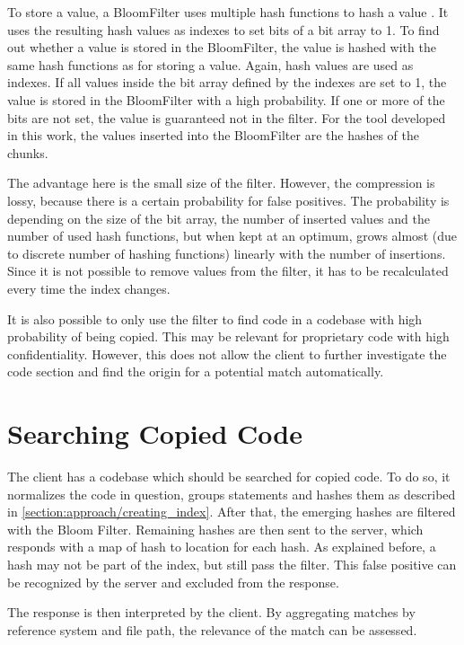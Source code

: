 To store a value, a BloomFilter uses multiple hash functions to hash a value \cite{bloom1970filter}.
It uses the resulting hash values as indexes to set bits of a bit array to 1.
To find out whether a value is stored in the BloomFilter, the value is hashed with the same hash functions as for storing a value.
Again, hash values are used as indexes.
If all values inside the bit array defined by the indexes are set to 1, the value is stored in the BloomFilter with a high probability.
If one or more of the bits are not set, the value is guaranteed not in the filter.
For the tool developed in this work, the values inserted into the BloomFilter are the hashes of the chunks.

The advantage here is the small size of the filter.
However, the compression is lossy, because there is a certain probability for false positives.
The probability is depending on the size of the bit array, the number of inserted values and the number of used hash functions, but when kept at an optimum, grows almost (due to discrete number of hashing functions) linearly with the number of insertions.
Since it is not possible to remove values from the filter, it has to be recalculated every time the index changes.

It is also possible to only use the filter to find code in a codebase with high probability of being copied.
This may be relevant for proprietary code with high confidentiality.
However, this does not allow the client to further investigate the code section and find the origin for a potential match automatically.
	
\section{Searching Copied Code}\label{section:approach/searching_copied_code}
The client has a codebase which should be searched for copied code.
To do so, it normalizes the code in question, groups statements and hashes them as described in \autoref{section:approach/creating_index}.
After that, the emerging hashes are filtered with the Bloom Filter.
Remaining hashes are then sent to the server, which responds with a map of hash to location for each hash.
As explained before, a hash may not be part of the index, but still pass the filter.
This false positive can be recognized by the server and excluded from the response.

The response is then interpreted by the client.
By aggregating matches by reference system and file path, the relevance of the match can be assessed.
